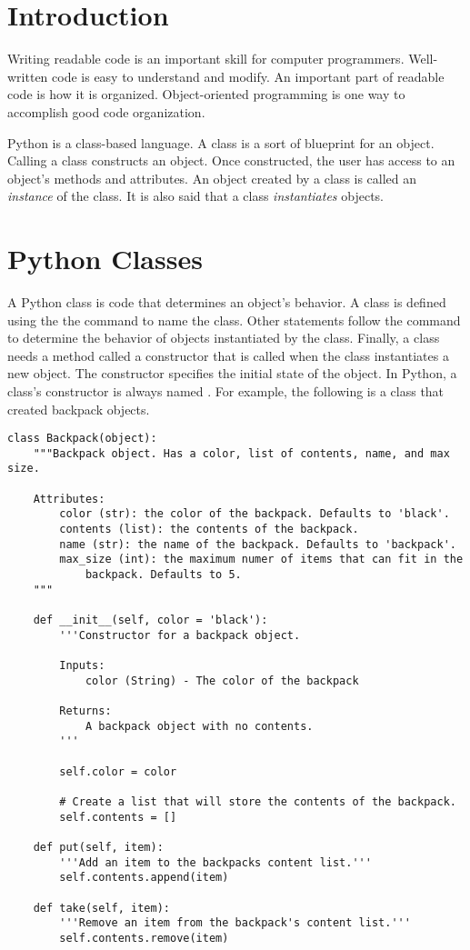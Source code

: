 \label{lab:OOP}

\section*{Introduction}

Writing readable code is an important skill for computer programmers.
Well-written code is easy to understand and modify.
An important part of readable code is how it is organized.
Object-oriented programming is one way to accomplish good code organization.

Python is a class-based language.
A class is a sort of blueprint for an object.
Calling a class constructs an object.
Once constructed, the user has access to an object's methods and attributes.
An object created by a class is called an \emph{instance} of the class.
It is also said that a class \emph{instantiates} objects.

\section*{Python Classes}

A Python class is code that determines an object's behavior.
A class is defined using the the  command to name the class.
Other statements follow the  command to determine the behavior of objects instantiated by the class.
Finally, a class needs a method called a constructor that is called when the class instantiates a new object.
The constructor specifies the initial state of the object.
In Python, a class's constructor is always named .
For example, the following is a class that created backpack objects.

\begin{lstlisting}
class Backpack(object):
    """Backpack object. Has a color, list of contents, name, and max size.
    
    Attributes:
        color (str): the color of the backpack. Defaults to 'black'.
        contents (list): the contents of the backpack.
        name (str): the name of the backpack. Defaults to 'backpack'.
        max_size (int): the maximum numer of items that can fit in the
            backpack. Defaults to 5.
    """
	
	def __init__(self, color = 'black'):
		'''Constructor for a backpack object.

		Inputs:
			color (String) - The color of the backpack

		Returns:
			A backpack object with no contents.
		'''

		self.color = color
	
		# Create a list that will store the contents of the backpack.
		self.contents = []

	def put(self, item):
		'''Add an item to the backpacks content list.'''
		self.contents.append(item)

	def take(self, item):
		'''Remove an item from the backpack's content list.'''
		self.contents.remove(item)

\end{lstlisting}


